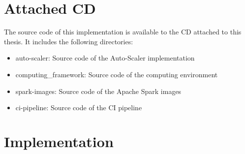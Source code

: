 \chapter{Attached CD}
\label{chap:appendix_cd}
The source code of this implementation is available to the CD attached to this thesis. It includes the following directories:
\begin{itemize}
\item auto-scaler: Source code of the Auto-Scaler implementation
\item computing\_framework: Source code of the computing environment
\item spark-images: Source code of the Apache Spark images
\item ci-pipeline: Source code of the CI pipeline
\end{itemize}

\chapter{Implementation}

